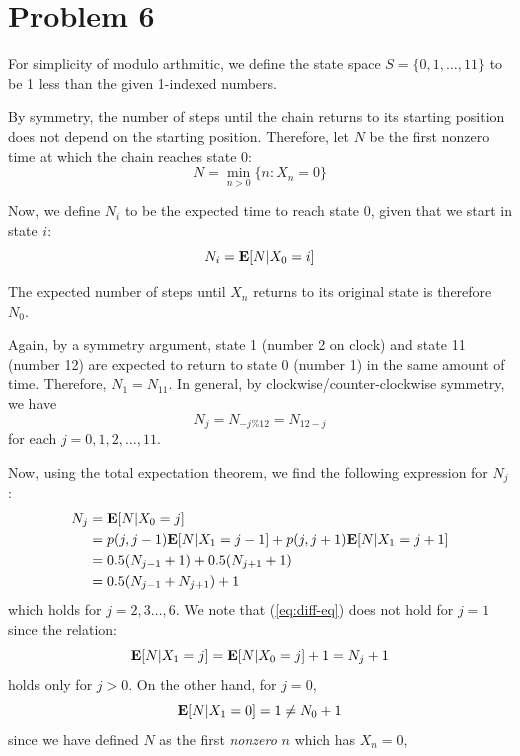 \documentclass{homework}
\begin{document}
\section{Problem 6}

For simplicity of modulo arthmitic, we define the state space
$S = \{0, 1, \dots, 11\}$ to be 1 less than the given 1-indexed numbers.

By symmetry, the number of steps until the chain returns to its starting position
does not depend on the starting position. Therefore, let $N$ be the first nonzero
time at which the chain reaches state 0:
\begin{equation*}
    N = \min_{n>0} \{n: X_n = 0\}
\end{equation*}

Now, we define $N_i$ to be the expected time to reach state 0, given that
we start in state $i$:
\begin{equation*}
    N_i = {\bf E}[N | X_0 = i]
\end{equation*}

The expected number of steps until $X_n$ returns to its original state
is therefore $N_0$.

Again, by a symmetry argument, state 1 (number 2 on clock) and state 11
(number 12) are expected to return to state 0 (number 1) in the same amount
of time. Therefore, $N_1 = N_{11}$. In general, by clockwise/counter-clockwise
symmetry, we have 
\begin{equation*}
    N_j = N_{-j \% 12} = N_{12 - j}
\end{equation*}
for each $j = 0,1, 2, \dots, 11$.

Now, using the total expectation theorem, we find the following expression
for $N_j$:
\begin{align}
    N_j &= {\bf E}[N | X_0 = j] \\
        &= p(j, j-1) {\bf E}[N | X_1 = j-1] + p(j, j+1) {\bf E}[N | X_1 = j+1]  \\
        &= 0.5 (N_{j-1} + 1) + 0.5 (N_{j+1} + 1) \\
        &= 0.5 (N_{j-1} + N_{j+1}) + 1 \label{eq:diff-eq}
\end{align}
which holds for $j=2, 3\dots, 6$. We note that (\ref{eq:diff-eq}) does
not hold for $j=1$ since the relation:
\begin{equation*}
    {\bf E}[N | X_1 = j] = {\bf E}[N | X_0 = j] + 1 = N_j + 1
\end{equation*}
holds only for $j>0$. On the other hand, for $j=0$,
\begin{equation*}
    {\bf E}[N | X_1 = 0] = 1 \neq N_0 + 1
\end{equation*}
since we have defined $N$ as the first {\it nonzero} $n$ which has $X_n = 0$, 
\end{document}
